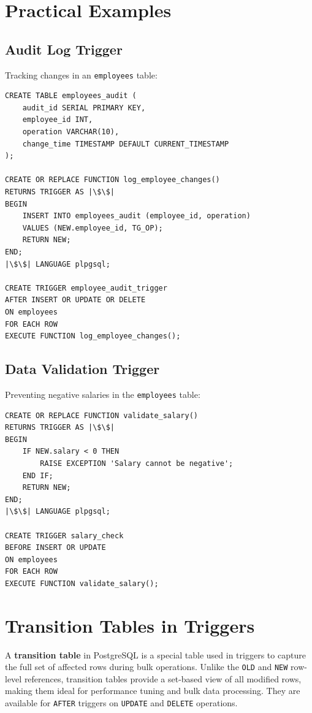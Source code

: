 \documentclass{article}
\begin{document}
\section{Practical Examples}
\subsection*{Audit Log Trigger}
Tracking changes in an \texttt{employees} table:

\begin{verbatim}
CREATE TABLE employees_audit (
    audit_id SERIAL PRIMARY KEY,
    employee_id INT,
    operation VARCHAR(10),
    change_time TIMESTAMP DEFAULT CURRENT_TIMESTAMP
);

CREATE OR REPLACE FUNCTION log_employee_changes()
RETURNS TRIGGER AS |\$\$|
BEGIN
    INSERT INTO employees_audit (employee_id, operation)
    VALUES (NEW.employee_id, TG_OP);
    RETURN NEW;
END;
|\$\$| LANGUAGE plpgsql;

CREATE TRIGGER employee_audit_trigger
AFTER INSERT OR UPDATE OR DELETE
ON employees
FOR EACH ROW
EXECUTE FUNCTION log_employee_changes();
\end{verbatim}

\subsection*{Data Validation Trigger}
Preventing negative salaries in the \texttt{employees} table:

\begin{verbatim}
CREATE OR REPLACE FUNCTION validate_salary()
RETURNS TRIGGER AS |\$\$|
BEGIN
    IF NEW.salary < 0 THEN
        RAISE EXCEPTION 'Salary cannot be negative';
    END IF;
    RETURN NEW;
END;
|\$\$| LANGUAGE plpgsql;

CREATE TRIGGER salary_check
BEFORE INSERT OR UPDATE
ON employees
FOR EACH ROW
EXECUTE FUNCTION validate_salary();
\end{verbatim}

\section{Transition Tables in Triggers}

A \textbf{transition table} in PostgreSQL is a special table used in triggers to capture the full set of affected rows during bulk operations. Unlike the \texttt{OLD} and \texttt{NEW} row-level references, transition tables provide a set-based view of all modified rows, making them ideal for performance tuning and bulk data processing. They are available for \texttt{AFTER} triggers on \texttt{UPDATE} and \texttt{DELETE} operations.
\end{document}
